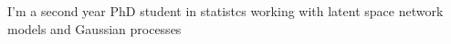 I'm a second year PhD student in statistcs working with latent space network models and Gaussian processes